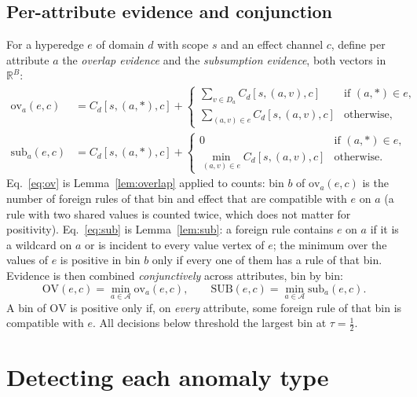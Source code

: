 \documentclass[preprint,12pt]{elsarticle}
\theoremstyle{definition}
\begin{document}
\subsection{Per-attribute evidence and conjunction}
\label{sec:decode}
For a hyperedge $e$ of domain $d$ with scope $s$ and an effect channel $c$, define per attribute $a$ the \emph{overlap evidence} and the \emph{subsumption evidence}, both vectors in $\mathbb{R}^B$:
\begin{align}
\mathrm{ov}_a(e,c)&=C_d[s,(a,\ast),c]+
\begin{cases}\sum_{v\in D_a}C_d[s,(a,v),c] & \text{if } (a,\ast)\in e,\\[2pt]
\sum_{(a,v)\in e}C_d[s,(a,v),c] & \text{otherwise,}\end{cases}\label{eq:ov}\\
\mathrm{sub}_a(e,c)&=C_d[s,(a,\ast),c]+
\begin{cases}0 & \text{if } (a,\ast)\in e,\\[2pt]
\min_{(a,v)\in e}C_d[s,(a,v),c] & \text{otherwise.}\end{cases}\label{eq:sub}
\end{align}
Eq.~\eqref{eq:ov} is Lemma~\ref{lem:overlap} applied to counts: bin $b$ of $\mathrm{ov}_a(e,c)$ is the number of foreign rules of that bin and effect that are compatible with $e$ on $a$ (a rule with two shared values is counted twice, which does not matter for positivity). Eq.~\eqref{eq:sub} is Lemma~\ref{lem:sub}: a foreign rule contains $e$ on $a$ if it is a wildcard on $a$ or is incident to every value vertex of $e$; the minimum over the values of $e$ is positive in bin $b$ only if every one of them has a rule of that bin. Evidence is then combined \emph{conjunctively} across attributes, bin by bin:
\begin{equation}
\mathrm{OV}(e,c)=\min_{a\in\mathcal{A}}\mathrm{ov}_a(e,c),\qquad \mathrm{SUB}(e,c)=\min_{a\in\mathcal{A}}\mathrm{sub}_a(e,c).
\label{eq:conj}
\end{equation}
A bin of $\mathrm{OV}$ is positive only if, on \emph{every} attribute, some foreign rule of that bin is compatible with $e$. All decisions below threshold the largest bin at $\tau=\tfrac12$.

\section{Detecting each anomaly type}
\label{sec:types}
\end{document}
